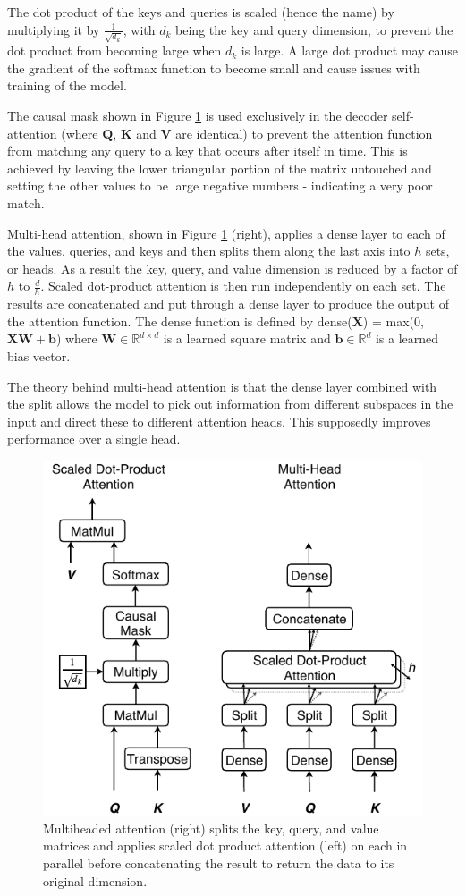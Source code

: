 \documentclass[conference]{IEEEtran}
\begin{document}
The dot product of the keys and queries is scaled (hence the name) by multiplying it by $\frac{1}{\sqrt{d_k}}$, with $d_k$ being the key and query dimension, to prevent the dot product from becoming large when $d_k$ is large.
A large dot product may cause the gradient of the softmax function to become small and cause issues with training of the model.

The causal mask shown in Figure \ref{fig:multihead} is used exclusively in the decoder self-attention (where $\boldsymbol{Q}$, $\boldsymbol{K}$ and $\boldsymbol{V}$ are identical) to prevent the attention function from matching any query to a key that occurs after itself in time.
This is achieved by leaving the lower triangular portion of the matrix untouched and setting the other values to be large negative numbers - indicating a very poor match.

Multi-head attention, shown in Figure \ref{fig:multihead} (right), applies a dense layer to each of the values, queries, and keys and then splits them along the last axis into $h$ sets, or heads.
As a result the key, query, and value dimension is reduced by a factor of $h$ to $\frac{d}{h}$.
Scaled dot-product attention is then run independently on each set.
The results are concatenated and put through a dense layer to produce the output of the attention function.
The dense function is defined by dense($\boldsymbol{X}$) = max(0, $\boldsymbol{XW} + \boldsymbol{b}$) where $\boldsymbol{W} \in \mathbb{R}^{d \times d}$ is a learned square matrix and $\boldsymbol{b} \in \mathbb{R}^{d}$ is a learned bias vector.

The theory behind multi-head attention is that the dense layer combined with the split allows the model to pick out information from different subspaces in the input and direct these to different attention heads.
This supposedly improves performance over a single head.

\begin{figure}[htbp]
	\centerline{\includegraphics[width=.35\textwidth]{images/multihead_attn.pdf}}
	\caption{Multiheaded attention (right) splits the key, query, and value matrices and applies scaled dot product attention (left) on each in parallel before concatenating the result to return the data to its original dimension.}
	\label{fig:multihead}
\end{figure}
\end{document}
